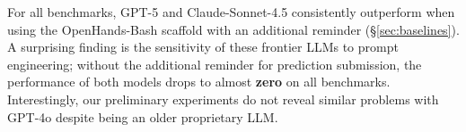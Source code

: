 For all benchmarks, GPT-5 and Claude-Sonnet-4.5 consistently outperform \methodname when using the OpenHands-Bash scaffold with an additional reminder (\S\ref{sec:baselines}). A surprising finding is the sensitivity of these frontier LLMs to prompt engineering; without the additional reminder for prediction submission, the performance of both models drops to almost \textbf{zero} on all benchmarks. Interestingly, our preliminary experiments do not reveal similar problems with GPT-4o despite being an older proprietary LLM.






